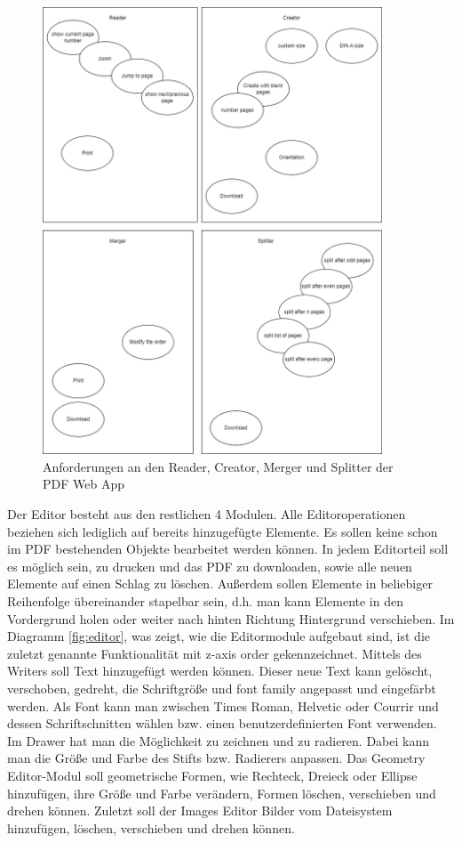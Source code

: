 \begin{figure}[!htbp]
	\centering
	\includegraphics[width=0.9\textwidth]{"images/app-funktionen-anforderungen.png"}
	\caption{Anforderungen an den Reader, Creator, Merger und Splitter der PDF Web App}
	\label{fig:modules4}
\end{figure}

Der Editor besteht aus den restlichen 4 Modulen. Alle Editoroperationen beziehen sich lediglich auf bereits hinzugefügte Elemente. Es sollen keine schon im PDF bestehenden Objekte bearbeitet werden können. In jedem Editorteil soll es möglich sein, zu drucken und das PDF zu downloaden, sowie alle neuen Elemente auf einen Schlag zu löschen. Außerdem sollen Elemente in beliebiger Reihenfolge übereinander stapelbar sein, d.h. man kann Elemente in den Vordergrund holen oder weiter nach hinten Richtung Hintergrund verschieben. Im Diagramm \ref{fig:editor}, was zeigt, wie die Editormodule aufgebaut sind, ist die zuletzt genannte Funktionalität mit z-axis order gekennzeichnet. Mittels des Writers soll Text hinzugefügt werden können. Dieser neue Text kann gelöscht, verschoben, gedreht, die Schriftgröße und font family angepasst und eingefärbt werden. Als Font kann man zwischen Times Roman, Helvetic oder Courrir und dessen Schriftschnitten wählen bzw. einen benutzerdefinierten Font verwenden. Im Drawer hat man die Möglichkeit zu zeichnen und zu radieren. Dabei kann man die Größe und Farbe des Stifts bzw. Radierers anpassen. Das Geometry Editor-Modul soll geometrische Formen, wie Rechteck, Dreieck oder Ellipse hinzufügen, ihre Größe und Farbe verändern, Formen löschen, verschieben und drehen können. Zuletzt soll der Images Editor Bilder vom Dateisystem hinzufügen, löschen, verschieben und drehen können.


